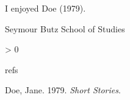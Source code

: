 
%
%
\newlength{\cslhangindent}
\setlength{\cslhangindent}{1.5em}
\newlength{\csllabelwidth}
\setlength{\csllabelwidth}{3em}
\newenvironment{CSLReferences}[2] %
 {%
  \setlength{\parindent}{0pt}
  \ifodd #1 \everypar{\setlength{\hangindent}{\cslhangindent}}\ignorespaces\fi
  \ifnum #2 > 0
  \setlength{\parskip}{#2\baselineskip}
  \fi
 }%
 {}
\usepackage{calc}
\newcommand{\CSLBlock}[1]{#1\hfill\break}
\newcommand{\CSLLeftMargin}[1]{\parbox[t]{\csllabelwidth}{#1}}
\newcommand{\CSLRightInline}[1]{\parbox[t]{\linewidth - \csllabelwidth}{#1}\break}
\newcommand{\CSLIndent}[1]{\hspace{\cslhangindent}#1}



I enjoyed Doe (1979).

Seymour Butz
School of Studies


\begin{CSLReferences}{1}{0}

\hypertarget{refs}{refs}

\leavevmode\hypertarget{ref-Doe}{}%
Doe, Jane. 1979. \emph{Short Stories}.

\end{CSLReferences}


